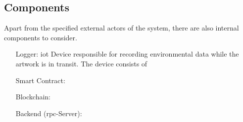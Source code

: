 \subsection{Components}
Apart from the specified external actors of the system, there are also internal components to consider.

\begin{itemize}[align=left,font=\itshape]
    \item[Logger:] \gls{iot} Device responsible for recording environmental data while the artwork is in transit. The device consists of  
    \item[Smart Contract:]  
    \item[Blockchain:]
    \item[Backend (\gls{rpc}-Server):]
\end{itemize}

